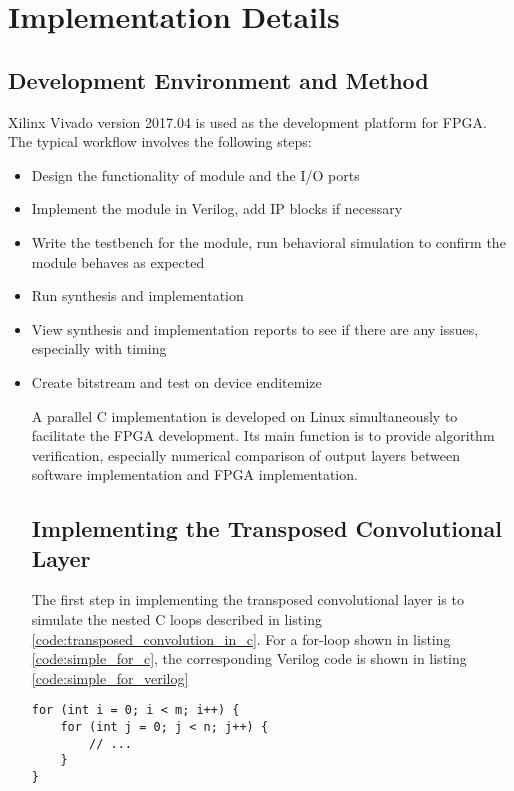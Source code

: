
\chapter{Implementation Details}

\section{Development Environment and Method}

Xilinx Vivado version 2017.04 is used as the development platform for FPGA. The typical workflow involves
the following steps:

\begin{itemize}
  \item Design the functionality of module and the I/O ports
  \item Implement the module in Verilog, add IP blocks if necessary
  \item Write the testbench for the module, run behavioral simulation to confirm the module behaves as
    expected
  \item Run synthesis and implementation
  \item View synthesis and implementation reports to see if there are any issues, especially with timing
  \item Create bitstream and test on device
end{itemize}

A parallel C implementation is developed on Linux simultaneously to facilitate the FPGA development.
Its main function is to provide algorithm verification, especially numerical comparison of output layers
between software implementation and FPGA implementation.

\section{Implementing the Transposed Convolutional Layer}

The first step in implementing the transposed convolutional layer is to simulate the nested C loops
described in listing \ref{code:transposed_convolution_in_c}. For a for-loop shown in listing
\ref{code:simple_for_c}, the corresponding Verilog code is shown in listing \ref{code:simple_for_verilog}

\begin{code}
\begin{verbatim}
for (int i = 0; i < m; i++) {
    for (int j = 0; j < n; j++) {
        // ...
    }
}
\end{verbatim}
\label{code:simple_for_c}
\end{code}


\end{itemize}

